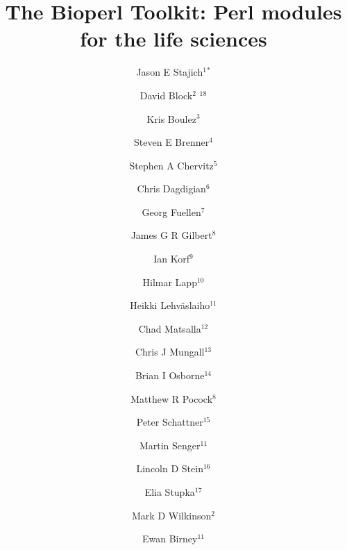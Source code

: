 \documentclass[12pt]{article}
\begin{document}
\doublespacing

\title{The Bioperl Toolkit: Perl modules for the life sciences}


\author{Jason E Stajich$^{1}$$^*$ 
\and David Block$^{2}$ $^{18}$ 
\and Kris Boulez$^{3}$
\and Steven E Brenner$^{4}$ 
\and Stephen A Chervitz$^{5}$ 
\and Chris Dagdigian$^{6}$ 
\and Georg Fuellen$^{7}$ 
\and James G R Gilbert$^{8}$
\and Ian Korf$^{9}$ 
\and Hilmar Lapp$^{10}$ 
\and Heikki Lehv\"{a}slaiho$^{11}$ 
\and Chad Matsalla$^{12}$ 
\and Chris J Mungall$^{13}$ 
\and Brian I Osborne$^{14}$ 
\and Matthew R Pocock$^8$ 
\and Peter Schattner$^{15}$ 
\and Martin Senger$^{11}$ 
\and Lincoln D Stein$^{16}$ 
\and Elia Stupka$^{17}$ 
\and Mark D Wilkinson$^2$ 
\and Ewan Birney$^{11}$ \\}

\maketitle
\end{document}
